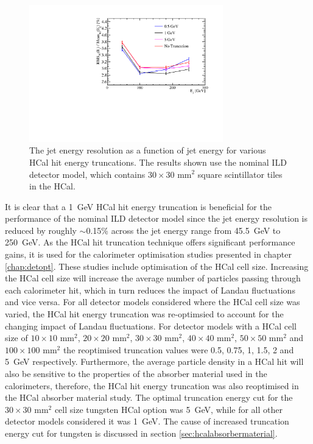 \begin{figure}[h!]
\includegraphics[width=0.75\textwidth]{EnergyEstimators/Plots/CellTruncation/JER_vs_JetEnergy_HCalCellTruncation.pdf}
\caption[The jet energy resolution as a function of jet energy for various HCal hit energy truncations.  The results shown use the nominal ILD detector model, which contains $30\times30 \text{ mm}^{2}$ square scintillator tiles in the HCal.]{The jet energy resolution as a function of jet energy for various HCal hit energy truncations.  The results shown use the nominal ILD detector model, which contains $30\times30 \text{ mm}^{2}$ square scintillator tiles in the HCal.}
\label{fig:jercelltrunc}
\end{figure}

It is clear that a 1~GeV HCal hit energy truncation is beneficial for the performance of the nominal ILD detector model since the jet energy resolution is reduced by roughly $\sim$0.15\% across the jet energy range from 45.5~GeV to 250~GeV.  As the HCal hit truncation technique offers significant performance gains, it is used for the calorimeter optimisation studies presented in chapter \ref{chap:detopt}.  These studies include optimisation of the HCal cell size.  Increasing the HCal cell size will increase the average number of particles passing through each calorimeter hit, which in turn reduces the impact of Landau fluctuations and vice versa.  For all detector models considered where the HCal cell size was varied, the HCal hit energy truncation was re-optimsied to account for the changing impact of Landau fluctuations.  For detector models with a HCal cell size of $10 \times 10\text{ mm}^{2}$, $20 \times 20\text{ mm}^{2}$, $30 \times 30\text{ mm}^{2}$, $40 \times 40\text{ mm}^{2}$, $50 \times 50\text{ mm}^{2}$ and $100 \times 100\text{ mm}^{2}$ the reoptimised truncation values were 0.5, 0.75, 1, 1.5, 2 and 5~GeV respectively.  Furthermore, the average particle density in a HCal hit will also be sensitive to the properties of the absorber material used in the calorimeters, therefore, the HCal hit energy truncation was also reoptimised in the HCal absorber material study.  The optimal truncation energy cut for the $30 \times 30\text{ mm}^{2}$ cell size tungsten HCal option was 5~GeV, while for all other detector models considered it was 1~GeV.  The cause of increased truncation energy cut for tungsten is discussed in section \ref{sec:hcalabsorbermaterial}.

